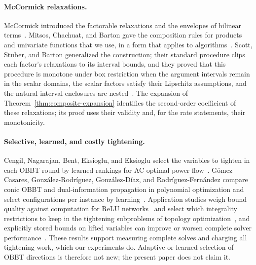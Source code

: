 \paragraph{McCormick relaxations.} McCormick introduced the factorable
relaxations and the envelopes of bilinear
terms~\cite{mccormick1976-computability-of-global-solutions-to}. Mitsos,
Chachuat, and Barton gave the composition rules for products and univariate
functions that we use, in a form that applies to
algorithms~\cite{mitsos2009-mccormick-based-relaxations-of-algorithms}.
Scott, Stuber, and Barton generalized the construction; their standard
procedure clips each factor's relaxations to its interval bounds, and they
proved that this procedure is monotone under box restriction when the
argument intervals remain in the scalar domains, the scalar factors satisfy
their Lipschitz assumptions, and the natural interval enclosures are
nested~\cite{scott2011-generalized-mccormick-relaxations}. The
expansion of Theorem~\ref{thm:composite-expansion} identifies the
second-order coefficient of these relaxations; its proof uses their
validity and, for the rate statements, their monotonicity.

\paragraph{Selective, learned, and costly tightening.} Cengil, Nagarajan,
Bent, Eksioglu, and Eksioglu select the variables to tighten in each OBBT
round by learned rankings for AC optimal power
flow~\cite{cengil2025learning}. G\'omez-Casares, Gonz\'alez-Rodr\'iguez,
Gonz\'alez-D\'iaz, and Rodr\'iguez-Fern\'andez compare conic OBBT and
dual-information propagation in polynomial optimization and select
configurations per instance by learning~\cite{gomezcasares2025domain}.
Application studies weigh bound quality against computation for ReLU
networks~\cite{badilla2024tradeoffs} and select which integrality
restrictions to keep in the tightening subproblems of topology
optimization~\cite{pineda2025sweetspot}, and explicitly stored bounds on
lifted variables can improve or worsen complete solver
performance~\cite{gonzalezdiaz2025lifted}. These results support measuring
complete solves and charging all tightening work, which our experiments do.
Adaptive or learned selection of OBBT directions is therefore not new; the
present paper does not claim it.


